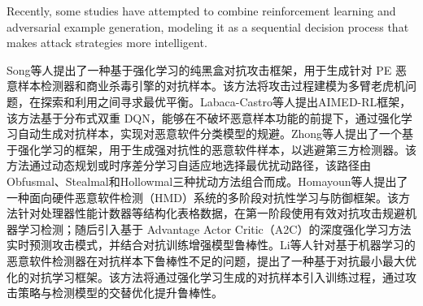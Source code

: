 Recently, some studies have attempted to combine reinforcement learning and adversarial example generation, modeling it as a sequential decision process that makes attack strategies more intelligent.

Song等人提出了一种基于强化学习的纯黑盒对抗攻击框架\cite{song2022mab}，用于生成针对 PE 恶意样本检测器和商业杀毒引擎的对抗样本。该方法将攻击过程建模为多臂老虎机问题，在探索和利用之间寻求最优平衡。Labaca-Castro等人提出AIMED-RL框架\cite{labaca2021aimed}，该方法基于分布式双重 DQN，能够在不破坏恶意样本功能的前提下，通过强化学习自动生成对抗样本，实现对恶意软件分类模型的规避。Zhong等人提出了一个基于强化学习的框架\cite{zhong2022reinforcement}，用于生成强对抗性的恶意软件样本，以逃避第三方检测器。该方法通过动态规划或时序差分学习自适应地选择最优扰动路径，该路径由Obfusmal、Stealmal和Hollowmal三种扰动方法组合而成。Homayoun等人提出了一种面向硬件恶意软件检测（HMD）系统的多阶段对抗性学习与防御框架\cite{he2024beyond}。该方法针对处理器性能计数器等结构化表格数据，在第一阶段使用有效对抗攻击规避机器学习检测；随后引入基于 Advantage Actor Critic（A2C）的深度强化学习方法实时预测攻击模式，并结合对抗训练增强模型鲁棒性。Li等人\cite{ebrahimi2022adversarial}针对基于机器学习的恶意软件检测器在对抗样本下鲁棒性不足的问题，提出了一种基于对抗最小最大优化的对抗学习框架。该方法将通过强化学习生成的对抗样本引入训练过程，通过攻击策略与检测模型的交替优化提升鲁棒性。

